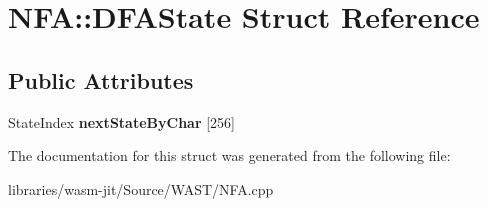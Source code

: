 \hypertarget{struct_n_f_a_1_1_d_f_a_state}{}\section{N\+FA\+:\+:D\+F\+A\+State Struct Reference}
\label{struct_n_f_a_1_1_d_f_a_state}
\subsection*{Public Attributes}
\begin{DoxyCompactItemize}
\item 
\mbox{\label{struct_n_f_a_1_1_d_f_a_state_a083307996063d9b16394c352067d7a42}} 
State\+Index {\bfseries next\+State\+By\+Char} \mbox{[}256\mbox{]}
\end{DoxyCompactItemize}


The documentation for this struct was generated from the following file\+:\begin{DoxyCompactItemize}
\item 
libraries/wasm-\/jit/\+Source/\+W\+A\+S\+T/N\+F\+A.\+cpp\end{DoxyCompactItemize}
